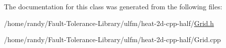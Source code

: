 The documentation for this class was generated from the following files\+:\begin{DoxyCompactItemize}
\item 
/home/randy/\+Fault-\/\+Tolerance-\/\+Library/ulfm/heat-\/2d-\/cpp-\/half/\hyperlink{Grid_8h}{Grid.\+h}\item 
/home/randy/\+Fault-\/\+Tolerance-\/\+Library/ulfm/heat-\/2d-\/cpp-\/half/Grid.\+cpp\end{DoxyCompactItemize}
